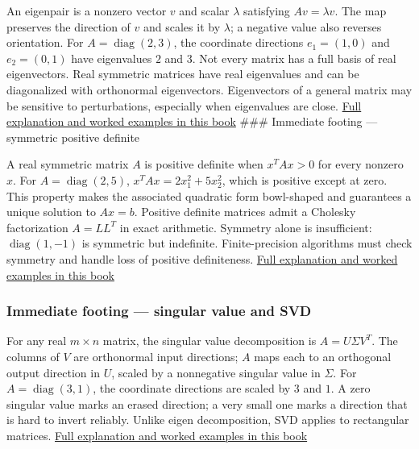 An eigenpair is a nonzero vector \(v\) and scalar \(\lambda\) satisfying \(Av=\lambda v\). The map preserves the direction of \(v\) and scales it by \(\lambda\); a negative value also reverses orientation. For \(A=\operatorname{diag}(2,3)\), the coordinate directions \(e_1=(1,0)\) and \(e_2=(0,1)\) have eigenvalues \(2\) and \(3\). Not every matrix has a full basis of real eigenvectors. Real symmetric matrices have real eigenvalues and can be diagonalized with orthonormal eigenvectors. Eigenvectors of a general matrix may be sensitive to perturbations, especially when eigenvalues are close. \hyperref[01-foundations-i-ch020-eigenvectors-reveal-the-directions-a-square-map-does-not-turn]{Full explanation and worked examples in this book} \#\#\# Immediate footing --- symmetric positive definite

A real symmetric matrix \(A\) is positive definite when \(x^TAx>0\) for every nonzero \(x\). For \(A=\operatorname{diag}(2,5)\), \(x^TAx=2x_1^2+5x_2^2\), which is positive except at zero. This property makes the associated quadratic form bowl-shaped and guarantees a unique solution to \(Ax=b\). Positive definite matrices admit a Cholesky factorization \(A=LL^T\) in exact arithmetic. Symmetry alone is insufficient: \(\operatorname{diag}(1,-1)\) is symmetric but indefinite. Finite-precision algorithms must check symmetry and handle loss of positive definiteness. \hyperref[01-foundations-i-ch020-positive-definiteness-is-a-structural-promise]{Full explanation and worked examples in this book}

\subsubsection{Immediate footing --- singular value and SVD}\label{01-foundations-i-ch018-immediate-footing-singular-value-and-svd}

For any real \(m\times n\) matrix, the singular value decomposition is \(A=U\Sigma V^T\). The columns of \(V\) are orthonormal input directions; \(A\) maps each to an orthogonal output direction in \(U\), scaled by a nonnegative singular value in \(\Sigma\). For \(A=\operatorname{diag}(3,1)\), the coordinate directions are scaled by \(3\) and \(1\). A zero singular value marks an erased direction; a very small one marks a direction that is hard to invert reliably. Unlike eigen decomposition, SVD applies to rectangular matrices. \hyperref[02-foundations-ii-ch024-singular-value-decomposition-covers-every-rectangular-map]{Full explanation and worked examples in this book}

